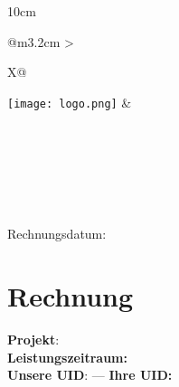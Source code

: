 \documentclass[a4paper,11pt]{article}
\newcommand{\contactinfo}{%
    \FjCompanyUrl \\
    \FjCompanyEmail \\
}
\begin{document}
\thispagestyle{firstpage}

\renewcommand{\footrulewidth}{0.4pt}

\begin{minipage}[t]{0.33\textwidth}
\raggedright
\vspace{-2.9em}
  \textsc{\FjClientCompany}\\[0.3ex]
  \textbf{\FjClientCareOf}\\[0.3ex]
  \FjClientStreet \\[0.3ex]
  \FjClientAreaCode\space \FjClientCity\\[0.3ex]
  \FjClientCountry \\[0.3ex]
\end{minipage}
\hfill
\begin{minipage}[t]{0.65\textwidth}
\begin{center}
\begin{tabularx}{10cm}{@{}m{3.2cm} >{\raggedright\arraybackslash}X@{}}
\texttt{[image: logo.png]} &
\begin{minipage}[t]{\linewidth}
  \vspace{-3.5em}
  \small
  \textbf{\FjCompanyName} \\[-0.2em]
  \FjCompanyStreet\\[-0.2ex]
  \FjCompanyAreaCodeCity\\[1.2ex]
  \contactinfo
\end{minipage}
\end{tabularx}
\end{center}
\end{minipage}

\setlength{\parindent}{0pt}
\setlength{\parskip}{0.5em}

\vspace{1.0cm}
\null\hfill Rechnungsdatum: \FjDate

\section*{Rechnung \FjDocId}

\textbf{Projekt}: \FjProjectName \\
\textbf{Leistungszeitraum:} \FjInvoiceFrom \makeatletter {} \makeatother \\
\textbf{Unsere UID}: \FjUID \space --- \textbf{Ihre UID:} \FjClientUID
\vspace{1em}
\end{document}
